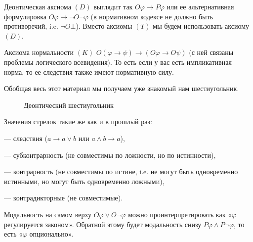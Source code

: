 \documentclass[openany]{book}
\theoremstyle{plain}
\theoremstyle{definition}
\begin{document}
Деонтическая аксиома \((D)\) выглядит так \(O \varphi \to P \varphi\) или ее альтернативная формулировка \(O \varphi \to \neg O \neg \varphi\) (в нормативном кодексе не должно быть противоречий, i.e. \(\neg O \bot\)). Вместо аксиомы \((T)\) мы будем использовать аксиому \((D)\).

Аксиома нормальности \((K)\) \(O(\varphi \to \psi) \to (O \varphi \to O \psi) \) (с ней связаны проблемы логического всевидения). То есть если у вас есть импликативная норма, то ее следствия также имеют нормативную силу.

Обобщая весь этот материал мы получаем уже знакомый нам шестиугольник.
\begin{figure}[H]
    \centering
    \caption{Деонтический шестиугольник}
\end{figure}
Значения стрелок такие же как и в прошлый раз:
\begin{itemize}
     — следствия (\(a \to a \lor b\) или \(a \land b \to a\)),

     — субконтрарность (не совместимы по ложности, но по истинности),

     — контрарность (не совместимы по истине, i.e. не могут быть одновременно истинными, но могут быть одновременно ложными),

     — контрадикторные (не совместимые).
\end{itemize}

Модальность на самом верху \(O \varphi \lor O \neg \varphi\) можно проинтерпретировать как «\(\varphi\) регулируется законом». Обратной этому будет модальность снизу \(P \varphi \land P \neg \varphi\), то есть «\(\varphi\) опционально».
\end{document}
